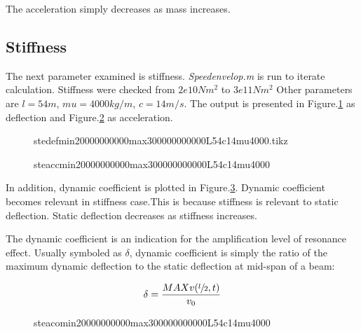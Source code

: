 The acceleration simply decreases as mass increases.

\subsection{Stiffness}

The next parameter examined is stiffness. \textit{Speedenvelop.m} is run to iterate calculation. Stiffness were checked from $2e10 Nm^2$ to $3e11 Nm^2$ Other parameters are $l=54m$, $mu=4000kg/m$, $c=14m/s$. The output is presented in Figure.\ref{fig:stedefmin20000000000max300000000000L54c14mu4000} as deflection and Figure.\ref{fig:steaccmin20000000000max300000000000L54c14mu4000} as acceleration. 



\begin{figure}[h!]
\centering 
\setlength\figureheight{6cm} 
\setlength\figurewidth{6cm} 
 
\caption{stedefmin20000000000max300000000000L54c14mu4000.tikz} 
\label{fig:stedefmin20000000000max300000000000L54c14mu4000} 
\end{figure}


\begin{figure}[h!]
\centering 
\setlength\figureheight{6cm} 
\setlength\figurewidth{6cm} 
 
\caption{steaccmin20000000000max300000000000L54c14mu4000} 
\label{fig:steaccmin20000000000max300000000000L54c14mu4000} 
\end{figure}

In addition, dynamic coefficient is plotted in Figure.\ref{fig:steacomin20000000000max300000000000L54c14mu4000}. Dynamic coefficient becomes relevant in stiffness case.This is because stiffness is relevant to static deflection. Static deflection decreases as stiffness increases. 

The dynamic coefficient is an indication for the amplification level of resonance effect. Usually symboled as $\delta$, dynamic coefficient is simply the ratio of the maximum dynamic deflection to the static deflection at mid-span of a beam:

$$\delta = \frac{MAX v(\sfrac{l}{2},t )}{v_0}$$

\begin{figure}[h!]
\centering 
\setlength\figureheight{6cm} 
\setlength\figurewidth{6cm} 
 
\caption{steacomin20000000000max300000000000L54c14mu4000} 
\label{fig:steacomin20000000000max300000000000L54c14mu4000} 
\end{figure}

